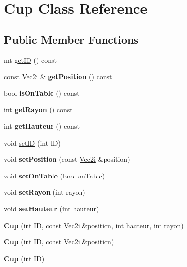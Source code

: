 \hypertarget{classCup}{}\section{Cup Class Reference}
\label{classCup}
\subsection*{Public Member Functions}
\begin{DoxyCompactItemize}
\item 
int \mbox{\hyperlink{classCup_afba137db1fb0642aac55f5677fe01763}{get\+ID}} () const
\item 
\mbox{\label{classCup_a42d5904549ed1aada9717386e756f5e0}} 
const \mbox{\hyperlink{classVec2}{Vec2i}} \& {\bfseries get\+Position} () const
\item 
\mbox{\label{classCup_a20d63a988fe05fb23894761733f6a02a}} 
bool {\bfseries is\+On\+Table} () const
\item 
\mbox{\label{classCup_a364ff2d529d0cb26c8350f3aebeee0ab}} 
int {\bfseries get\+Rayon} () const
\item 
\mbox{\label{classCup_a09bdb50068a6b1ff7c081d250915ab14}} 
int {\bfseries get\+Hauteur} () const
\item 
void \mbox{\hyperlink{classCup_a5f0cbe5a1263d430d373a38e33d4d121}{set\+ID}} (int ID)
\item 
\mbox{\label{classCup_aa3792525ba5aee7acf2c10e949a1f700}} 
void {\bfseries set\+Position} (const \mbox{\hyperlink{classVec2}{Vec2i}} \&position)
\item 
\mbox{\label{classCup_a1fd7ba0abc7891e0430d036f94066d28}} 
void {\bfseries set\+On\+Table} (bool on\+Table)
\item 
\mbox{\label{classCup_a400340a74f1b11a0fce0248e833c3fb7}} 
void {\bfseries set\+Rayon} (int rayon)
\item 
\mbox{\label{classCup_a127b4e827cd7d235f43d4654515ba753}} 
void {\bfseries set\+Hauteur} (int hauteur)
\item 
\mbox{\label{classCup_a71339589c3fd2f209caeed245d561172}} 
{\bfseries Cup} (int ID, const \mbox{\hyperlink{classVec2}{Vec2i}} \&position, int hauteur, int rayon)
\item 
\mbox{\label{classCup_a89ec7af0cd40e58c09cf4594a007ca8a}} 
{\bfseries Cup} (int ID, const \mbox{\hyperlink{classVec2}{Vec2i}} \&position)
\item 
\mbox{\label{classCup_a923395d0a96058627c91ddc193230017}} 
{\bfseries Cup} (int ID)
\end{DoxyCompactItemize}


